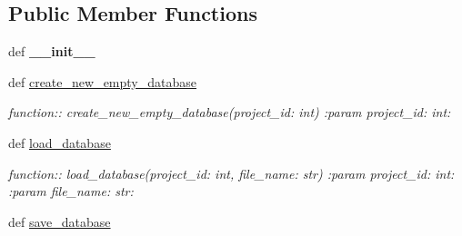 \subsection*{Public Member Functions}
\begin{DoxyCompactItemize}
\item 
def {\bfseries \+\_\+\+\_\+init\+\_\+\+\_\+}\hypertarget{classplume-creator_1_1src_1_1plume_1_1data_1_1database__manager_1_1_database_manager_a4895fd57c41e947397975aa796b3cdff}{}\label{classplume-creator_1_1src_1_1plume_1_1data_1_1database__manager_1_1_database_manager_a4895fd57c41e947397975aa796b3cdff}

\item 
def \hyperlink{classplume-creator_1_1src_1_1plume_1_1data_1_1database__manager_1_1_database_manager_a7214e89e17e9e48e282ce29acf5e0417}{create\+\_\+new\+\_\+empty\+\_\+database}\hypertarget{classplume-creator_1_1src_1_1plume_1_1data_1_1database__manager_1_1_database_manager_a7214e89e17e9e48e282ce29acf5e0417}{}\label{classplume-creator_1_1src_1_1plume_1_1data_1_1database__manager_1_1_database_manager_a7214e89e17e9e48e282ce29acf5e0417}

\begin{DoxyCompactList}\small\item\em function\+:\+: create\+\_\+new\+\_\+empty\+\_\+database(project\+\_\+id\+: int) \+:param project\+\_\+id\+: int\+: \end{DoxyCompactList}\item 
def \hyperlink{classplume-creator_1_1src_1_1plume_1_1data_1_1database__manager_1_1_database_manager_aa526d457e4a48bb07f182c2962687a4b}{load\+\_\+database}\hypertarget{classplume-creator_1_1src_1_1plume_1_1data_1_1database__manager_1_1_database_manager_aa526d457e4a48bb07f182c2962687a4b}{}\label{classplume-creator_1_1src_1_1plume_1_1data_1_1database__manager_1_1_database_manager_aa526d457e4a48bb07f182c2962687a4b}

\begin{DoxyCompactList}\small\item\em function\+:\+: load\+\_\+database(project\+\_\+id\+: int, file\+\_\+name\+: str) \+:param project\+\_\+id\+: int\+: \+:param file\+\_\+name\+: str\+: \end{DoxyCompactList}\item 
def \hyperlink{classplume-creator_1_1src_1_1plume_1_1data_1_1database__manager_1_1_database_manager_a4eb57421f64180ba57f712018438fa41}{save\+\_\+database}\hypertarget{classplume-creator_1_1src_1_1plume_1_1data_1_1database__manager_1_1_database_manager_a4eb57421f64180ba57f712018438fa41}{}\label{classplume-creator_1_1src_1_1plume_1_1data_1_1database__manager_1_1_database_manager_a4eb57421f64180ba57f712018438fa41}


\end{DoxyCompactItemize}
